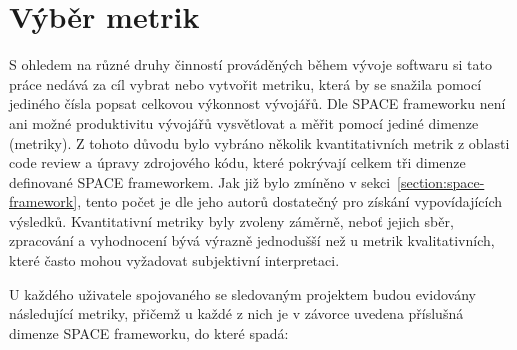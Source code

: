 \section{Výběr metrik}
S ohledem na různé druhy činností prováděných během vývoje softwaru si tato práce nedává za cíl vybrat nebo vytvořit metriku, která by se snažila pomocí jediného čísla popsat celkovou výkonnost vývojářů. Dle SPACE frameworku není ani možné produktivitu vývojářů vysvětlovat a měřit pomocí jediné dimenze (metriky). \cite{space} Z tohoto důvodu bylo vybráno několik kvantitativních metrik z oblasti code review a úpravy zdrojového kódu, které pokrývají celkem tři dimenze definované SPACE frameworkem. Jak již bylo zmíněno v sekci~\ref{section:space-framework}, tento počet je dle jeho autorů dostatečný pro získání vypovídajících výsledků. Kvantitativní metriky byly zvoleny záměrně, neboť jejich sběr, zpracování a vyhodnocení bývá výrazně jednodušší než u metrik kvalitativních, které často mohou vyžadovat subjektivní interpretaci.

U každého uživatele spojovaného se sledovaným projektem budou evidovány následující metriky, přičemž u každé z nich je v závorce uvedena příslušná dimenze SPACE frameworku, do které spadá:

